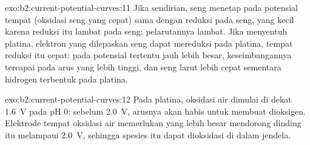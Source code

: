 \begin{solution}{exo:b2:current-potential-curves:11}
Jika sendirian, seng menetap pada potensial tempat 
(oksidasi seng yang cepat) sama dengan  reduksi  pada
seng, yang kecil karena reduksi itu lambat pada seng: pelarutannya lambat.
Jika menyentuh platina, elektron yang dilepaskan seng dapat mereduksi
 pada platina, tempat reduksi itu cepat:  pada potensial
tertentu jauh lebih besar, keseimbangannya tercapai pada arus yang lebih
tinggi, dan seng larut lebih cepat sementara hidrogen terbentuk pada
platina.
\end{solution}

\begin{solution}{exo:b2:current-potential-curves:12}
Pada platina, oksidasi air dimulai di dekat \qty{1.6}{V} pada pH 0:
sebelum \qty{2.0}{V}, arusnya akan habis untuk membuat dioksigen.
Elektrode tempat oksidasi air memerlukan  yang lebih besar
mendorong dinding itu melampaui \qty{2.0}{V}, sehingga spesies itu dapat
dioksidasi di dalam jendela.
\end{solution}

